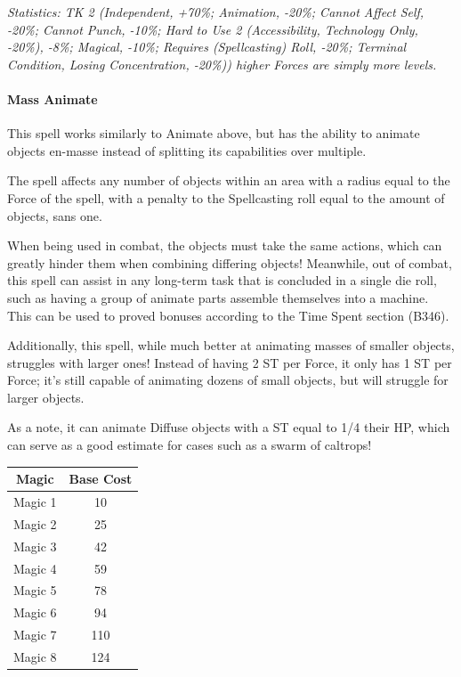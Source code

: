 \begin{multicols*}{3}
	\textcolor{OliveGreen}{\textit{Statistics: TK 2 (Independent, +70\%; Animation, -20\%; Cannot Affect Self, -20\%; Cannot Punch, -10\%; Hard to Use 2 (Accessibility, Technology Only, -20\%), -8\%; Magical, -10\%; Requires (Spellcasting) Roll, -20\%; Terminal Condition, Losing Concentration, -20\%)) higher Forces are simply more levels.}}
	
	\paragraph{Mass Animate}
	
	This spell works similarly to Animate above, but has the ability to animate objects en-masse instead of splitting its capabilities over multiple.
	
	The spell affects any number of objects within an area with a radius equal to the Force of the spell, with a penalty to the Spellcasting roll equal to the amount of objects, sans one. 
	
	When being used in combat, the objects must take the same actions, which can greatly hinder them when combining differing objects! Meanwhile, out of combat, this spell can assist in any long-term task that is concluded in a single die roll, such as having a group of animate parts assemble themselves into a machine. This can be used to proved bonuses according to the Time Spent section (B346).
	
	Additionally, this spell, while much better at animating masses of smaller objects, struggles with larger ones! Instead of having 2 ST per Force, it only has 1 ST per Force; it's still capable of animating dozens of small objects, but will struggle for larger objects.
	
	As a note, it can animate Diffuse objects with a ST equal to 1/4 their HP, which can serve as a good estimate for cases such as a swarm of caltrops!	
	
	\begin{center}
		\begin{tabular}{|c|c|}
			\hline
			Magic & Base Cost \\
			\hline
			\hline
			Magic 1 & 10 \\
			Magic 2 & 25 \\
			Magic 3 & 42 \\
			Magic 4 & 59 \\
			Magic 5 & 78 \\
			Magic 6 & 94 \\
			Magic 7 & 110 \\
			Magic 8 & 124 \\
			\hline
		\end{tabular}
	\end{center}



\end{multicols*}
